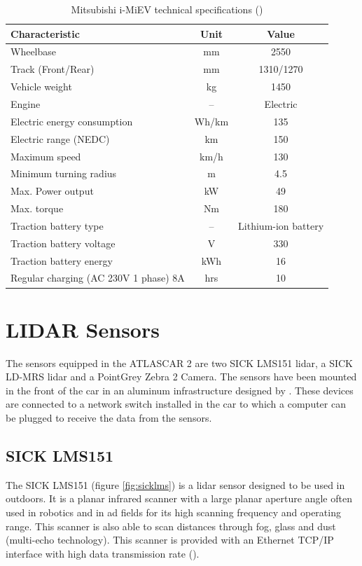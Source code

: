 \begin{table}[!h]
	\centering
	\caption{Mitsubishi i-MiEV technical specifications (\cite{MITSUBISHIMOTORS})}
	\label{tab: MiEV technical}
	\begin{tabular}{lcc}
		Characteristic & Unit & Value\\
		\hline
		Wheelbase & mm & 2550\\
		Track (Front/Rear) & mm & 1310/1270 \\
		Vehicle weight & kg  & 1450 \\
		\hline
		Engine & -- & Electric \\
		Electric energy consumption & Wh/km & 135 \\
		Electric range (NEDC)  & km & 150 \\
		Maximum speed & km/h & 130 \\
		Minimum turning radius & m & 4.5 \\
		Max. Power output & kW & 49 \\
		Max. torque & Nm & 180 \\
		\hline
		Traction battery type & -- & Lithium-ion battery \\
		Traction battery voltage & V & 330 \\
		Traction battery energy & kWh & 16 \\
		Regular charging (AC 230V 1 phase) 8A & hrs & 10 \\
	\end{tabular}
\end{table}

\section{LIDAR Sensors}

The sensors equipped in the ATLASCAR 2 are two SICK LMS151 \gls{lidar}, a SICK LD-MRS \gls{lidar} and a PointGrey Zebra 2 Camera. The sensors have been mounted in the front of the car in an aluminum infrastructure designed by \cite{Correia2017}. These devices are connected to a network switch installed in the car to which a computer can be plugged to receive the data from the sensors.

\subsection{SICK LMS151}

The SICK LMS151 (figure \ref{fig:sicklms}) is a \gls{lidar} sensor designed to be used in outdoors. It is a planar infrared scanner with a large planar aperture angle often used in robotics and in \gls{ad} fields for its high scanning frequency and operating range. This scanner is also able to scan distances through fog, glass and dust (multi-echo technology). This scanner is provided with an Ethernet TCP/IP interface with high data transmission rate (\cite{SICK}).

